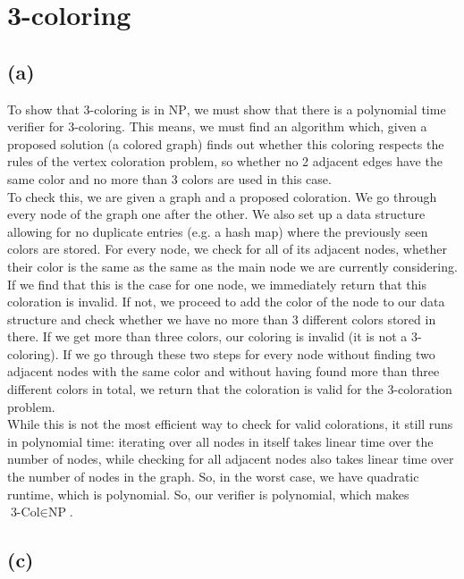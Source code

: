 

\setcounter{section}{2}
\usepackage{float}


\section{3-coloring}

\subsection{(a)}

To show that 3-coloring is in \textsc{NP}, we must show that there is a polynomial time verifier for 3-coloring. This means, we must find an algorithm which, given a proposed solution (a colored graph) finds out whether this coloring respects the rules of the vertex coloration problem, so whether no 2 adjacent edges have the same color and no more than 3 colors are used in this case.\\
To check this, we are given a graph and a proposed coloration. We go through every node of the graph one after the other. We also set up a data structure allowing for no duplicate entries (e.g. a hash map) where the previously seen colors are stored. For every node, we check for all of its adjacent nodes, whether their color is the same as the same as the main node we are currently considering. If we find that this is the case for one node, we immediately return that this coloration is invalid. If not, we proceed to add the color of the node to our data structure and check whether we have no more than 3 different colors stored in there. If we get more than three colors, our coloring is invalid (it is not a 3-coloring). If we go through these two steps for every node without finding two adjacent nodes with the same color and without having found more than three different colors in total, we return that the coloration is valid for the 3-coloration problem.\\
While this is not the most efficient way to check for valid colorations, it still runs in polynomial time: iterating over all nodes in itself takes linear time over the number of nodes, while checking for all adjacent nodes also takes linear time over the number of nodes in the graph. So, in the worst case, we have quadratic runtime, which is polynomial. So, our verifier is polynomial, which makes $\text{3-Col}\in\text{NP}$.

\subsection{(c)}

